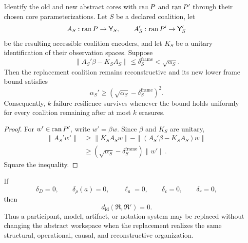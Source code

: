 \begin{corollary}
\label{cor:replacement-frame-bound}
Identify the old and new abstract cores with \(\operatorname{ran} P\) and \(\operatorname{ran} P'\)
through their chosen core parameterizations. Let \(S\) be a declared coalition,
let
\[
A_S:\operatorname{ran} P\to\mathsf Y_S,
\qquad
A_S':\operatorname{ran} P'\to\mathsf Y_S'
\]
be the resulting accessible coalition encoders, and let \(K_S\) be a unitary
identification of their observation spaces. Suppose
\[
\|A_S'\beta-K_SA_S\|
\leq
\delta_{S}^{\mathrm{frame}}
<
\sqrt{\alpha_S}.
\]
Then the replacement coalition remains reconstructive and its new lower frame
bound satisfies
\[
\boxed{
\alpha_S'
\geq
\left(
\sqrt{\alpha_S}-\delta_{S}^{\mathrm{frame}}
\right)^2.
}
\]
Consequently, \(k\)-failure resilience survives whenever the bound holds
uniformly for every coalition remaining after at most \(k\) erasures.
\end{corollary}

\begin{proof}
For \(w'\in\operatorname{ran} P'\), write \(w'=\beta w\). Since \(\beta\) and \(K_S\) are
unitary,
\[
\begin{aligned}
\|A_S'w'\|
&\geq
\|K_SA_Sw\|
-
\|(A_S'\beta-K_SA_S)w\|\\
&\geq
\left(
\sqrt{\alpha_S}-\delta_{S}^{\mathrm{frame}}
\right)\|w'\|.
\end{aligned}
\]
Square the inequality.
\end{proof}

\begin{corollary}\label{cor:exact-carrier-replacement}
If
\[
\delta_D=0,
\qquad
\delta_\rho(a)=0,
\qquad
\ell_a=0,
\qquad
\delta_c=0,
\qquad
\delta_r=0,
\]
then
\[
d_{\mathrm{id}}(\mathfrak R,\mathfrak R')=0.
\]
Thus a participant, model, artifact, or notation system may be replaced without
changing the abstract workspace when the replacement realizes the same
structural, operational, causal, and reconstructive organization.
\end{corollary}


